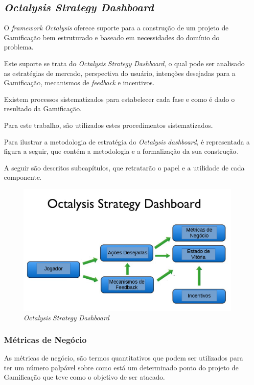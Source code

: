 \subsection{\textit{Octalysis Strategy Dashboard}}
\label{sec:octalysisdashborad}
O \textit{framework} \textit{Octalysis} oferece suporte para a construção de um projeto de Gamificação
bem estruturado e baseado em necessidades do domínio do problema.

Este suporte se trata do \textit{Octalysis} \textit{Strategy} \textit{Dashboard}, o qual pode ser analisado
 as
estratégias de mercado, perspectiva do usuário, intenções desejadas para a Gamificação,
mecanismos de \textit{feedback} e incentivos.

Existem processos sistematizados para estabelecer cada fase e como é dado o
resultado da Gamificação.

Para este trabalho, são utilizados estes procedimentos sistematizados.

Para ilustrar a metodologia de estratégia do \textit{Octalysis} \textit{dashboard}, é representada
a figura a seguir, que contém a metodologia e a formalização da sua construção.

A seguir são descritos subcapítulos, que retratarão o papel e a utilidade de
cada
componente.


 \begin{figure}[h]
     \centering

     \includegraphics[width=450px, scale=1]{figuras/dashboard}
     \caption{\textit{Octalysis} \textit{Strategy} \textit{Dashboard}}

     \label{fig:dashboard}
 \end{figure}

\subsubsection{Métricas de Negócio}
\label{sub:business_metrics}
As métricas de negócio, são termos quantitativos que podem ser utilizados
para ter um número palpável sobre como está um determinado ponto do projeto de Gamificação
que teve como o objetivo de ser atacado.

